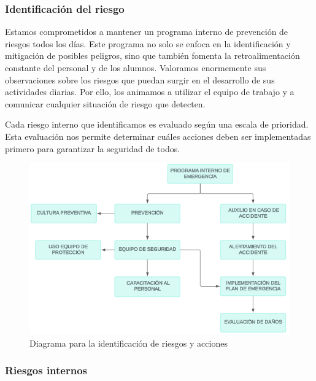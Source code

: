     \subsubsection{Identificación del riesgo}
    
    Estamos comprometidos a mantener un programa interno de prevención de riesgos todos los días. Este programa no solo se enfoca en la identificación y mitigación de posibles peligros, sino que también fomenta la retroalimentación constante del personal y de los alumnos. Valoramos enormemente sus observaciones sobre los riesgos que puedan surgir en el desarrollo de sus actividades diarias. Por ello, los animamos a utilizar el equipo de trabajo y a comunicar cualquier situación de riesgo que detecten.
    
    Cada riesgo interno que identificamos es evaluado según una escala de prioridad. Esta evaluación nos permite determinar cuáles acciones deben ser implementadas primero para garantizar la seguridad de todos.  
    
    \begin{figure}[H]
        \centering
        \includegraphics[scale=0.4]{35/Img/diagramaPE.png}
        \caption{Diagrama para la identificación de riesgos y acciones}
    \end{figure}
    
    \subsubsection{Riesgos internos}
    
